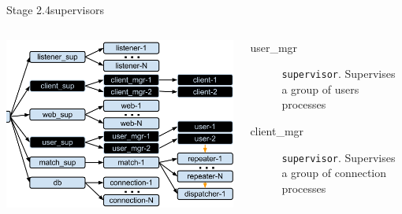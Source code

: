 \documentclass[utf8,hyperref={colorlinks=true}]{beamer}
\begin{document}
\begin{frame}{Stage 2.4}{supervisors}
	\begin{columns}
			\begin{center}
				\includegraphics[height=.65\textheight]{img/architecture-3-4.png}
			\end{center}
			\begin{description}
				\item[user\_mgr]
					\texttt{supervisor}. Supervises a group of users processes
				\item[client\_mgr]
					\texttt{supervisor}. Supervises a group of connection processes
			\end{description}
	\end{columns}
\end{frame}
\end{document}
